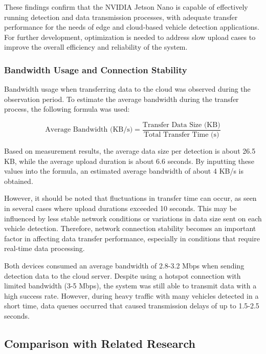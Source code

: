 These findings confirm that the NVIDIA Jetson Nano is capable of effectively running detection and data transmission processes, with adequate transfer performance for the needs of edge and cloud-based vehicle detection applications. For further development, optimization is needed to address slow upload cases to improve the overall efficiency and reliability of the system.

\subsubsection{Bandwidth Usage and Connection Stability}

Bandwidth usage when transferring data to the cloud was observed during the observation period. To estimate the average bandwidth during the transfer process, the following formula was used:

\begin{equation}
  \mbox{Average Bandwidth (KB/s)} = \frac{\mbox{Transfer Data Size (KB)}}{\mbox{Total Transfer Time (s)}}
\end{equation}

Based on measurement results, the average data size per detection is about 26.5 KB, while the average upload duration is about 6.6 seconds. By inputting these values into the formula, an estimated average bandwidth of about 4 KB/s is obtained.

However, it should be noted that fluctuations in transfer time can occur, as seen in several cases where upload durations exceeded 10 seconds. This may be influenced by less stable network conditions or variations in data size sent on each vehicle detection. Therefore, network connection stability becomes an important factor in affecting data transfer performance, especially in conditions that require real-time data processing.

Both devices consumed an average bandwidth of 2.8-3.2 Mbps when sending detection data to the cloud server. Despite using a hotspot connection with limited bandwidth (3-5 Mbps), the system was still able to transmit data with a high success rate. However, during heavy traffic with many vehicles detected in a short time, data queues occurred that caused transmission delays of up to 1.5-2.5 seconds.

\subsection{Comparison with Related Research}

